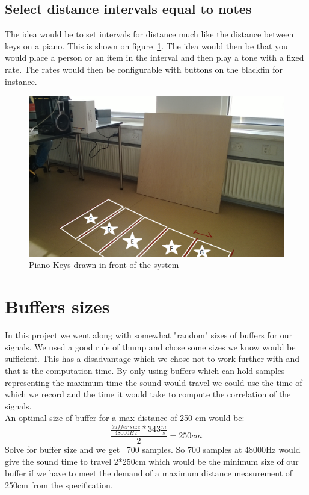 \subsection{Select distance intervals equal to notes}
The idea would be to set intervals for distance much like the distance between keys on a piano. This is shown on figure~\ref{fig:pianokeys}. The idea would then be that you would place a person or an item in the interval and then play a tone with a fixed rate. The rates would then be configurable with buttons on the blackfin for instance.
\begin{figure}[hbpt]
\centering
\includegraphics[scale=0.3]{billeder/pianokeyground}
\caption{Piano Keys drawn in front of the system}
\label{fig:pianokeys}
\end{figure}
\section{Buffers sizes}
In this project we went along with somewhat "random" sizes of buffers for our signals. We used a good rule of thump and chose some sizes we know would be sufficient. This has a disadvantage which we chose not to work further with and that is the computation time. By only using buffers which can hold samples representing the maximum time the sound would travel we could use the time of which we record and the time it would take to compute the correlation of the signals.\\
An optimal size of buffer for a max distance of 250 cm would be:\\
\begin{equation}
\frac{\frac{buffer\ size}{48000Hz}*343\frac{m}{s}}{2}=250cm
\end{equation}
Solve for buffer size and we get ~700 samples. So 700 samples at 48000Hz would give the sound time to travel 2*250cm which would be the minimum size of our buffer if we have to meet the demand of a maximum distance measurement of 250cm from the specification.
